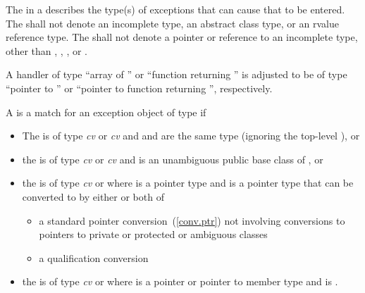 \pnum
The
in a
describes the type(s) of exceptions that can cause
that
to be entered.
%
%
%
%
The
shall not denote an incomplete type, an abstract class type, or an rvalue reference type.
The
shall not denote a pointer or reference to an
incomplete type, other than
,
,
,
or
.

\pnum
A handler of type ``array of
''
or ``function returning
''
is adjusted to be of type ``pointer to
''
or ``pointer to function
returning
'',
respectively.

\pnum
{}%
A
is a match for
an exception object
of type
if
\begin{itemize}
\item%
The
is of type
\textit{cv}
or
\textit{cv}
and
and
are the same type (ignoring the top-level
),
or
\item%
the
is of type
\textit{cv}
or
\textit{cv}
and
is an unambiguous public base class of
,
or
\item%
the
is of type
\textit{cv}
 or  where  is a pointer type
and
is a pointer type that can be
converted to 
by either or both of
\begin{itemize}

\item%
a standard pointer conversion~(\ref{conv.ptr}) not involving conversions
to pointers to private or protected or ambiguous classes
\item%
a qualification conversion

\end{itemize}

\item
the  is of type \textit{cv}  or  where  is a pointer or pointer to member type and  is .

\end{itemize}


